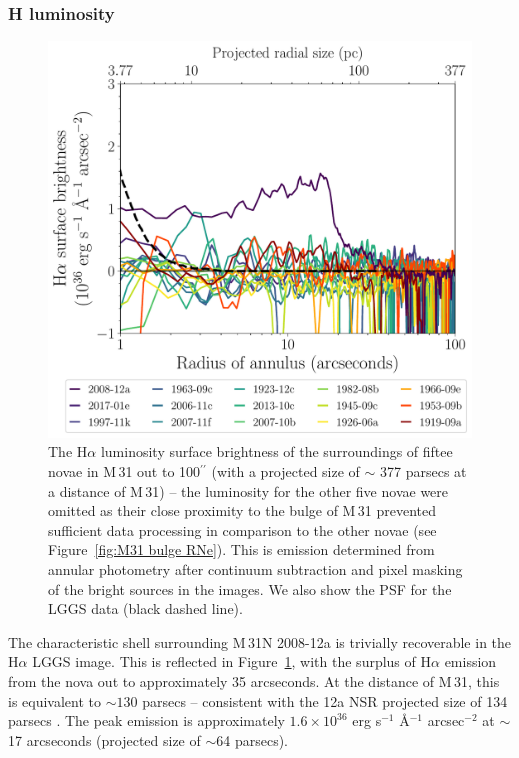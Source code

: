 \documentclass[fleqn,usenatbib]{mnras}
\begin{document}
\subsubsection{H\texorpdfstring{\boldmath{$\alpha$}}{alpha} luminosity}\label{M31 Ha luminosity}
\begin{figure}
\includegraphics[width=\columnwidth]{Figures/NSR_Radial_Ha_Luminosity_All.pdf}
\caption{The H$\alpha$ luminosity surface brightness of the surroundings of fiftee
novae in M\,31 out to 100$^{\prime \prime}$ (with a projected size of $\sim$ 377 parsecs at a distance of M\,31) -- the luminosity for the other five novae were omitted as their close proximity to the bulge of M\,31 prevented sufficient data processing in comparison to the other novae (see Figure~\ref{fig:M31 bulge RNe}). This is emission determined from annular photometry after continuum subtraction and pixel masking of the bright sources in the images. We also show the PSF for the LGGS data (black dashed line).}
\label{fig:NSR Ha luminosity}
\end{figure}

The characteristic shell surrounding M\,31N 2008-12a is trivially recoverable in the H$\alpha$ LGGS image. This is reflected in Figure~\ref{fig:NSR Ha luminosity}, with the surplus of H$\alpha$ emission from the nova out to approximately 35 arcseconds. At the distance of M\,31, this is equivalent to ${\sim}130$ parsecs -- consistent with the 12a NSR projected size of 134 parsecs \citep{2019Natur.565..460D}. The peak emission is approximately $1.6 \times 10^{36}$ erg s$^{-1}$ \AA$^{-1}$ arcsec$^{-2}$ at ${\sim}$17 arcseconds (projected size of ${\sim}$64 parsecs).
\end{document}
